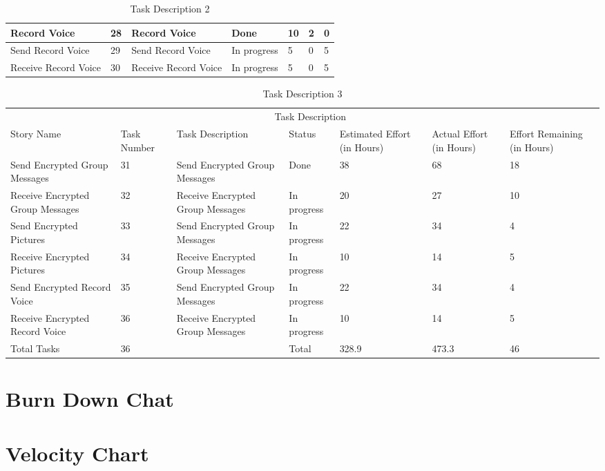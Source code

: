 \documentclass[a4paper]{article}
\begin{document}
\begin{table}
\begin{tabular}{p{3cm} p{1cm} p{3.5cm} p{1cm} p{1cm} p{1cm} p{1cm}}
 Record Voice & 28 & Record Voice & Done & 10 & 2 & 0\\ 
 \midrule
 
 Send Record Voice & 29 & Send Record Voice & In progress & 5 & 0 & 5\\ 
 \midrule
 
 Receive Record Voice & 30 & Receive Record Voice & In progress & 5 & 0 & 5\\ 
\hline
\end{tabular}
\caption{Task Description 2} %
\label{tab:template} %
\end{table}

\pagebreak


\begin{table} 
\begin{tabular}{p{3cm} p{1cm} p{3.5cm} p{1cm} p{1cm} p{1cm} p{1cm}} 
\hline %
& \multicolumn{5}{c}{Task Description} \\
\cmidrule(l){2-7}
Story Name & Task Number & Task Description & Status & Estimated Effort (in Hours) & Actual Effort (in Hours) & Effort Remaining (in Hours)\\ %
\hline

  Send Encrypted Group Messages & 31 & Send Encrypted Group Messages & Done & 38 & 68 & 18\\ 
 \midrule
 
 Receive Encrypted Group Messages & 32 & Receive Encrypted Group Messages & In progress & 20 & 27 & 10\\ 
 \midrule

 
  Send Encrypted Pictures & 33 & Send Encrypted Group Messages & In progress & 22 & 34 & 4\\ 
 \midrule
 
 Receive Encrypted Pictures & 34 & Receive Encrypted Group Messages & In progress & 10 & 14 & 5\\ 
 \midrule
 
  
  Send Encrypted Record Voice & 35 & Send Encrypted Group Messages & In progress & 22 & 34 & 4\\ 
 \midrule
 
 Receive Encrypted Record Voice & 36 & Receive Encrypted Group Messages & In progress & 10 & 14 & 5\\ 
\hline
Total Tasks & 36 & & Total & 328.9 & 473.3 & 46\\
\hline
\end{tabular}
\caption{Task Description 3} %
\label{tab:template} %
\end{table}

\newpage
\section{Burn Down Chat}

\pagebreak
\section{Velocity Chart}
\end{document}
